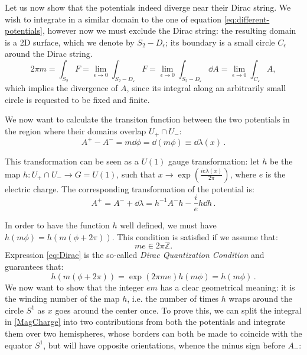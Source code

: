 \documentclass[main.tex]{subfiles}
\begin{document}
Let us now show that the potentials indeed diverge near their Dirac string. We wish to integrate in a similar domain to the one of equation \eqref{eq:different-potentials}, however now we must exclude the Dirac string: the resulting domain is a 2D surface, which we denote by $S_2 - D_\epsilon$; its boundary is a small circle $C_\epsilon$ around the Dirac string.
%
\begin{equation}\label{MagCharge}
2\pi m=\int_{S_2} F=\lim_{\epsilon\to 0}\int_{S_2-D_{\varepsilon}}F=\lim_{\epsilon\to 0}\int_{S_2-D_{\varepsilon}} \dd{A}=\lim_{\epsilon\to 0}\int_{C_{\varepsilon}} A,
\end{equation}
which implies the divergence of $A$, since its integral along an arbitrarily small circle is requested to be fixed and finite.

\medskip
We now want to calculate the transiton function between the two potentials in the region where their domains overlap $U_+ \cap U_-$:
\begin{equation}
A^+-A^-=m\dd{\phi}=\dd{(m\phi)} \equiv \dd{\lambda(x)}\,.
\end{equation}

This transformation can be seen as a $U(1)$ gauge transformation:
let $h$ be the map $h:U_+\cap U_- \to G=U(1)$, such that $x\to \exp(\frac{ie\lambda(x)}{2\pi})$, where $e$ is the electric charge.
The corresponding transformation of the potential is:
%
\begin{equation}
A^+=A^-+\dd{\lambda}=h^{-1}A^-h-\frac{i}{e}h \dd{h}\,.
\end{equation}

In order to have  the function $h$ well defined, we must have $h(m\phi) = h(m(\phi+ 2\pi))$.
This condition is satisfied if we assume that: 
\begin{equation}
me \in 2\pi\mathbb{Z}.
\label{eq:Dirac}
\end{equation}
Expression  \eqref{eq:Dirac} is the so-called \textit{Dirac Quantization Condition} and guarantees that: 
\begin{equation}
h(m(\phi + 2\pi)) =  \exp(2 \pi me)  h(m\phi) = h( m \phi) \,.
\end{equation}
We now want to show that the integer $em$ has a clear geometrical meaning: it is the winding number of the map $h$, i.e. the number of times $h$ wraps around the circle $S^1$ as $x$ goes around the center once.
To prove this, we can split the integral in \eqref{MagCharge} into two contributions from both the potentials and integrate them over two hemispheres, whose borders can both be made to coincide with the equator $S^1$, but will have opposite orientations, whence the minus sign before $A_-$:
\end{document}
